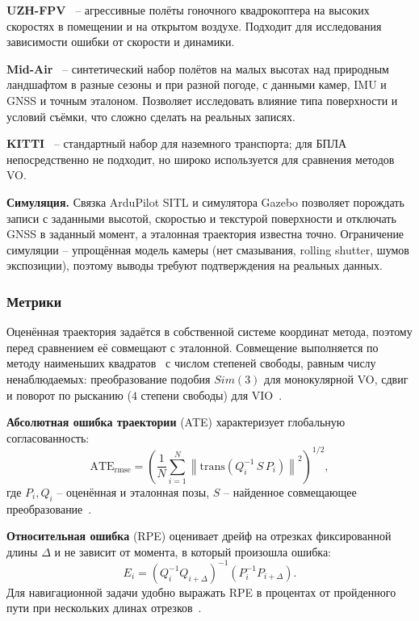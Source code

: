     \textbf{UZH-FPV}~\cite{uzh_fpv} -- агрессивные полёты гоночного квадрокоптера на высоких скоростях в помещении и на открытом воздухе.
    Подходит для исследования зависимости ошибки от скорости и динамики.

    \textbf{Mid-Air}~\cite{midair} -- синтетический набор полётов на малых высотах над природным ландшафтом в разные сезоны и при разной погоде, с данными камер, IMU и GNSS и точным эталоном.
    Позволяет исследовать влияние типа поверхности и условий съёмки, что сложно сделать на реальных записях.

    \textbf{KITTI}~\cite{kitti} -- стандартный набор для наземного транспорта; для БПЛА непосредственно не подходит, но широко используется для сравнения методов VO.

    \textbf{Симуляция.}
    Связка ArduPilot SITL и симулятора Gazebo позволяет порождать записи с заданными высотой, скоростью и текстурой поверхности и отключать GNSS в заданный момент, а эталонная траектория известна точно.
    Ограничение симуляции -- упрощённая модель камеры (нет смазывания, rolling shutter, шумов экспозиции), поэтому выводы требуют подтверждения на реальных данных.

    \subsubsection{Метрики}
    Оценённая траектория задаётся в собственной системе координат метода, поэтому перед сравнением её совмещают с эталонной.
    Совмещение выполняется по методу наименьших квадратов~\cite{umeyama} с числом степеней свободы, равным числу ненаблюдаемых: преобразование подобия $Sim(3)$ для монокулярной VO, сдвиг и поворот по рысканию ($4$ степени свободы) для VIO~\cite{traj_eval}.

    \textbf{Абсолютная ошибка траектории} (ATE) характеризует глобальную согласованность:
    \begin{equation}\label{eq:ate}
        \mathrm{ATE}_{\mathrm{rmse}} = \left( \frac{1}{N} \sum_{i=1}^{N} \left\| \mathrm{trans}\!\left( Q_i^{-1}\, S\, P_i \right) \right\|^2 \right)^{1/2},
    \end{equation}
    где $P_i, Q_i$ -- оценённая и эталонная позы, $S$ -- найденное совмещающее преобразование~\cite{tum_rgbd}.

    \textbf{Относительная ошибка} (RPE) оценивает дрейф на отрезках фиксированной длины $\Delta$ и не зависит от момента, в который произошла ошибка:
    \begin{equation}\label{eq:rpe}
        E_i = \left( Q_i^{-1} Q_{i+\Delta} \right)^{-1} \left( P_i^{-1} P_{i+\Delta} \right).
    \end{equation}
    Для навигационной задачи удобно выражать RPE в процентах от пройденного пути при нескольких длинах отрезков~\cite{traj_eval}.

